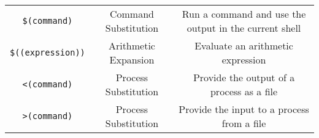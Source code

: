 \begin{table*}[h!]
\begin{tabular}{c c c}
    \texttt{\$(command)} & Command Substitution & Run a command and use the output in the current shell\\
    \texttt{\$((expression))} & Arithmetic Expansion & Evaluate an arithmetic expression\\
    \texttt{<(command)} & Process Substitution & Provide the output of a process as a file\\
    \texttt{>(command)} & Process Substitution & Provide the input to a process from a file\\
    \bottomrule
  \end{tabular}
\end{table*}

